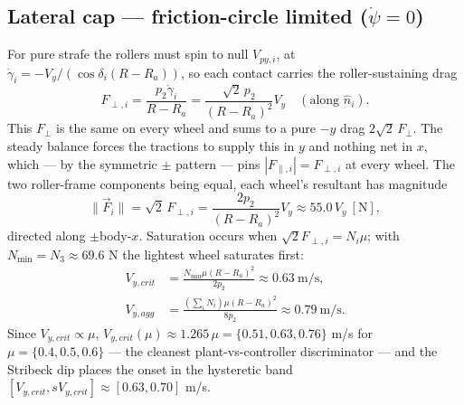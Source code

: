 \documentclass[11pt]{article}
\begin{document}
\subsection{Lateral cap --- friction-circle limited ($\dot\psi=0$)}
For pure strafe the rollers must spin to null $V_{py,i}$, at
$\dot\gamma_i=-V_y/(\cos\delta_i(R-R_a))$, so each contact carries the roller-sustaining drag
\begin{equation}
F_{\perp,i}=\frac{p_2\dot\gamma_i}{R-R_a}=\frac{\sqrt2\,p_2}{(R-R_a)^2}V_y\quad(\text{along }\hat n_i).
\end{equation}
This $F_\perp$ is the same on every wheel and sums to a pure $-y$ drag $2\sqrt2\,F_\perp$. The
steady balance forces the tractions to supply this in $y$ and nothing net in $x$, which --- by the
symmetric $\pm$ pattern --- pins $|F_{\parallel,i}|=F_{\perp,i}$ at every wheel. The two roller-frame
components being equal, each wheel's resultant has magnitude
\begin{equation}
\|\vec F_i\|=\sqrt2\,F_{\perp,i}=\frac{2p_2}{(R-R_a)^2}V_y\approx55.0\,V_y\ [\text{N}],
\end{equation}
directed along $\pm$body-$x$. Saturation occurs when $\sqrt2 F_{\perp,i}=N_i\mu$; with
$N_{\min}=N_3\approx69.6$ N the lightest wheel saturates first:
\begin{align}
V_{y,crit}&=\frac{N_{\min}\mu(R-R_a)^2}{2p_2}\approx0.63\ \text{m/s},\\
V_{y,agg}&=\frac{(\sum_iN_i)\mu(R-R_a)^2}{8p_2}\approx0.79\ \text{m/s}.
\end{align}
Since $V_{y,crit}\propto\mu$, $V_{y,crit}(\mu)\approx1.265\,\mu=\{0.51,0.63,0.76\}$ m/s for
$\mu=\{0.4,0.5,0.6\}$ --- the cleanest plant-vs-controller discriminator --- and the Stribeck dip
places the onset in the hysteretic band $[V_{y,crit},sV_{y,crit}]\approx[0.63,0.70]$ m/s.
\end{document}
